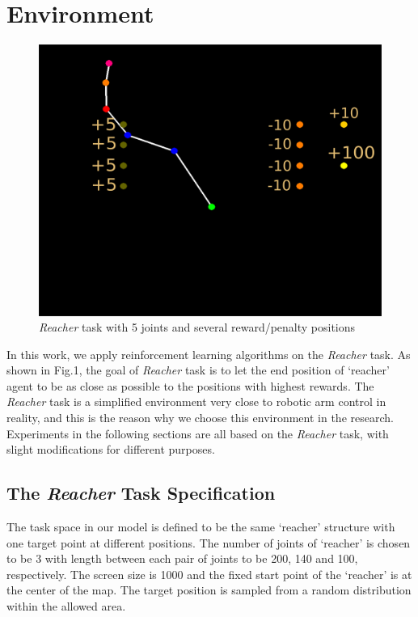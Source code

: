 \documentclass{article}
\begin{document}
\section{Environment}
\begin{figure}[htbp]
	\centering
	\includegraphics[scale=0.18]{img/reacher.png}
	\caption{\textit{Reacher} task with 5 joints and several reward/penalty positions}
	\label{fig:universe}
\end{figure}
In this work, we apply reinforcement learning algorithms on the \textit{Reacher} task. As shown in Fig.1, the goal of \textit{Reacher} task is to let the end position of `reacher'  agent to be as close as possible to the positions with highest rewards. The \textit{Reacher} task is a simplified environment very close to robotic arm control in reality, and this is the reason why we choose this environment in the research. Experiments in the following sections are all based on the \textit{Reacher} task, with slight modifications for different purposes.


\subsection{The \textit{Reacher} Task Specification}

The task space in our model is defined to be the same `reacher' structure with one target point at different positions. The number of joints of `reacher' is chosen to be 3 with length between each pair of joints to be 200, 140 and 100, respectively. The screen size is 1000 and the fixed start point of the `reacher' is at the center of the map. The target position is sampled from a random distribution within the allowed area.
\end{document}
